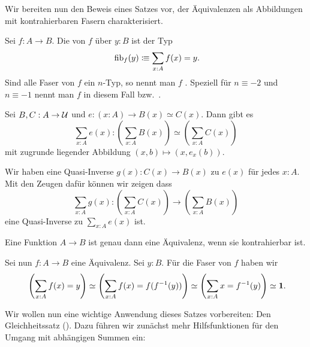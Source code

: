 Wir bereiten nun den Beweis eines Satzes vor,
der Äquivalenzen als Abbildungen mit kontrahierbaren Fasern charakterisiert.

\begin{definition}
  Sei $f:A\to B$. Die  von $f$ über $y:B$ ist der Typ\index{$\fib$}
  \[
    \fib_f(y)\colonequiv \sum_{x:A}f(x)=y\rlap{.}
  \]
  Sind alle Faser von $f$ ein $n$-Typ, so nennt man $f$ .
  Speziell für $n\equiv -2$ und $n\equiv -1$ nennt man $f$ in diesem Fall  bzw.\ .
\end{definition}

\begin{lemma}
  Sei $B,C:A\to\mathcal{U}$ und $e:(x:A)\to B(x)\simeq C(x)$.
  Dann gibt es
  \[\sum_{x:A} e(x) : \left(\sum_{x:A}B(x)\right)\simeq \left(\sum_{x:A}C(x)\right)
  \]
  mit zugrunde liegender Abbildung $(x,b)\mapsto (x,e_x(b))$.
\end{lemma}

\begin{beweis}
  Wir haben eine Quasi-Inverse $g(x):C(x)\to B(x)$ zu $e(x)$ für jedes $x:A$.
  Mit den Zeugen dafür können wir zeigen dass
  \[
    \sum_{x:A}g(x):\left(\sum_{x:A}C(x)\right) \to \left(\sum_{x:A}B(x)\right)
    \]
    eine Quasi-Inverse zu $\sum_{x:A}e(x)$ ist.
\end{beweis}

\begin{satz}
  \label{isequiv-iscontr-fib}
  Eine Funktion $A\to B$ ist genau dann eine Äquivalenz, wenn sie kontrahierbar ist.
\end{satz}

\begin{beweis}

  Sei nun $f:A\to B$ eine Äquivalenz.
  Sei $y:B$. Für die Faser von $f$ haben wir
  \[
    \left(\sum_{x:A}f(x)=y\right)\simeq \left(\sum_{x:A}f(x)=f(f^{-1}(y))\right)\simeq \left(\sum_{x:A}x=f^{-1}(y)\right)\simeq\eins\rlap{.}
    \]

\end{beweis}

Wir wollen nun eine wichtige Anwendung dieses Satzes vorbereiten: Den Gleichheitssatz ().
Dazu führen wir zunächst mehr Hilfsfunktionen für den Umgang mit abhängigen Summen ein:

